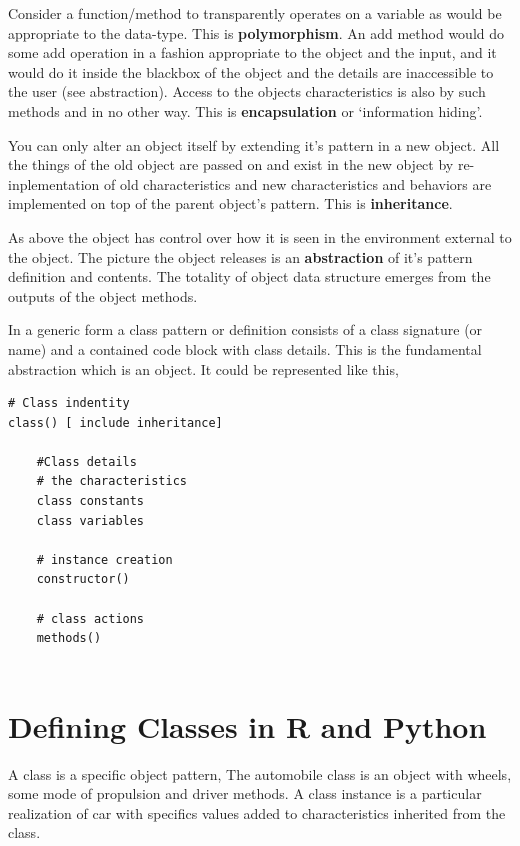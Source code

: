\documentclass[]{book}
\theoremstyle{definition}
\theoremstyle{definition}
\theoremstyle{definition}
\theoremstyle{remark}
\begin{document}
Consider a function/method to transparently operates on a variable as
would be appropriate to the data-type. This is \textbf{polymorphism}. An
add method would do some add operation in a fashion appropriate to the
object and the input, and it would do it inside the blackbox of the
object and the details are inaccessible to the user (see abstraction).
Access to the objects characteristics is also by such methods and in no
other way. This is \textbf{encapsulation} or `information hiding'.

You can only alter an object itself by extending it's pattern in a new
object. All the things of the old object are passed on and exist in the
new object by re-inplementation of old characteristics and new
characteristics and behaviors are implemented on top of the parent
object's pattern. This is \textbf{inheritance}.

As above the object has control over how it is seen in the environment
external to the object. The picture the object releases is an
\textbf{abstraction} of it's pattern definition and contents. The
totality of object data structure emerges from the outputs of the object
methods.

In a generic form a class pattern or definition consists of a class
signature (or name) and a contained code block with class details. This
is the fundamental abstraction which is an object. It could be
represented like this,

\begin{verbatim}
# Class indentity
class() [ include inheritance]

    #Class details
    # the characteristics
    class constants 
    class variables
  
    # instance creation
    constructor()
    
    # class actions
    methods()
    
\end{verbatim}

\section{Defining Classes in R and
Python}\label{defining-classes-in-r-and-python}

A class is a specific object pattern, The automobile class is an object
with wheels, some mode of propulsion and driver methods. A class
instance is a particular realization of car with specifics values added
to characteristics inherited from the class.
\end{document}
